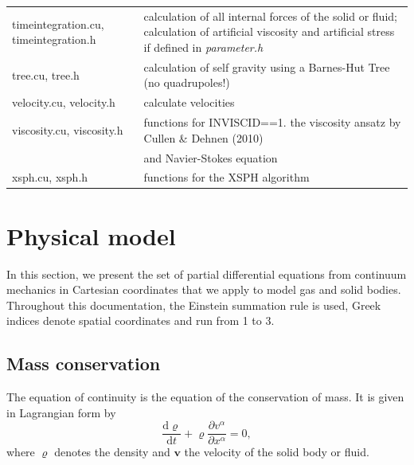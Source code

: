 \documentclass[10pt,fleqn,twoside]{article}
\newcommand{\vect}[1]{{\mathbf #1}}
\begin{document}
\begin{table}
\begin{tabular}[b]{p{6cm} p{9cm}}
timeintegration.cu, timeintegration.h	&	calculation of all internal forces of the solid or fluid; calculation of artificial viscosity and artificial stress if defined in \emph{parameter.h}		\\
tree.cu, tree.h		&	calculation of self gravity using a Barnes-Hut Tree (no quadrupoles!)	\\
velocity.cu, velocity.h		&	calculate velocities	\\
viscosity.cu, viscosity.h		&	functions for INVISCID==1. the viscosity ansatz by Cullen \& Dehnen (2010)\\
 & and Navier-Stokes equation \\
xsph.cu, xsph.h		&	functions for the XSPH algorithm	\\
\hline
\end{tabular}
\label{tab:file-list}
\end{table}



\section{Physical model}
In this section, we present the set of partial differential equations from continuum mechanics in Cartesian coordinates
that we apply to model gas and solid bodies.
Throughout this documentation, the Einstein summation rule is used, Greek indices denote spatial coordinates and run from 1 to
3.
\subsection{Mass conservation}
The equation of continuity is the equation of the conservation of mass. It is given in Lagrangian form by
\begin{equation}
\label{eq:conservation_of_mass}
\frac{\mathrm{d} \varrho}{\mathrm{d}t} + \varrho \frac{\partial v^\alpha}{\partial x^\alpha} = 0,
\end{equation}
where $\varrho$ denotes the density and $\vect{v}$ the velocity of the solid body or fluid.
\end{document}
